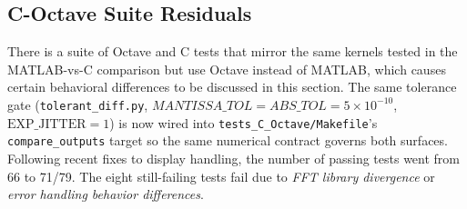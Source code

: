 \subsection{C-Octave Suite Residuals}

There is a suite of Octave and C tests that mirror the same kernels tested in the MATLAB-vs-C comparison but use Octave instead of MATLAB, which causes certain behavioral differences to be discussed in this section. The same tolerance gate (\texttt{tolerant\_diff.py}, $MANTISSA\_TOL = ABS\_TOL = 5 \times 10^{-10}$, $\text{EXP\_JITTER} = 1$) is now wired into \texttt{tests\_C\_Octave/Makefile}'s \texttt{compare\_outputs} target so the same numerical contract governs both surfaces. Following recent fixes to display handling, the number of passing tests went from 66 to 71/79. The eight still-failing tests fail due to \emph{FFT library divergence} or \emph{error handling behavior differences}. 
